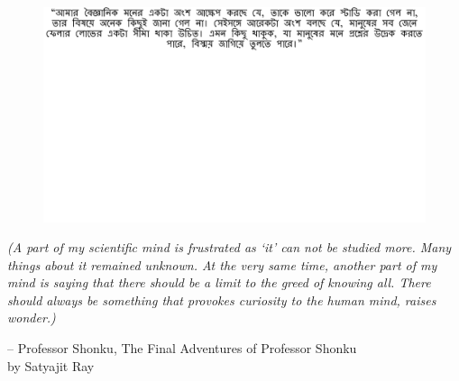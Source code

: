 \thispagestyle{empty}
{}

\vspace*{3cm}

\begin{center}
\begin{figure}
  \centering
  	\vspace{5cm}
    \includegraphics[width=\linewidth]{preamble/quote_1.pdf} 
\end{figure}
\vspace{-4cm}
\small
\emph{(A part of my scientific mind is frustrated as `it' can not be studied more. Many things about it remained unknown. At the very same time, another part of my mind is saying that there should be a limit to the greed of knowing all. There should always be something that provokes curiosity to the human mind, raises wonder.)}

\vspace{2em}
 -- Professor Shonku, The Final Adventures of Professor Shonku\\
 by Satyajit Ray 
\end{center}

\medskip
